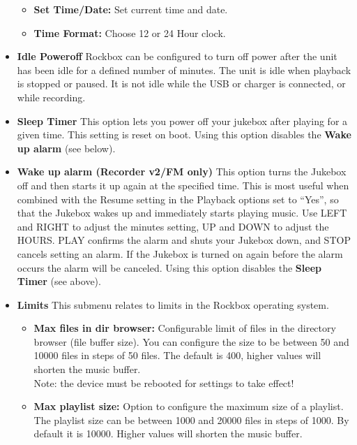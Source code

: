 \begin{itemize}
\begin{itemize}
\item \textbf{Set Time/Date: }
Set current time and date.
\item \textbf{Time Format: }
Choose 12 or 24 Hour clock. 
\end{itemize}

\item \textbf{\label{ref:idlepoweroff}Idle Poweroff}
Rockbox can be configured to turn off power after the unit has been idle
for a defined number of minutes. The unit is idle when playback is
stopped or paused. It is not idle while the USB or charger is
connected, or while recording.

\item \textbf{Sleep Timer}
This option lets you power off your jukebox after playing for a given
time. This setting is reset on boot.  Using this option disables the
\textbf{Wake up alarm} (see below).

\item \textbf{Wake up alarm (Recorder v2/FM only)}
This option turns the Jukebox off and then starts it up again at the
specified time. This is most useful when combined with the Resume
setting in the Playback options set to ``Yes'', so that the Jukebox
wakes up and immediately  starts playing music. Use LEFT and RIGHT to
adjust the minutes setting, UP and DOWN to adjust the HOURS.  PLAY
confirms the alarm and shuts your Jukebox down, and STOP cancels
setting an alarm.  If the Jukebox is turned on again before the alarm
occurs the alarm will be canceled.  Using this option disables the \textbf{Sleep Timer} (see above).

\item \textbf{Limits}
This submenu relates to limits in the Rockbox operating system.

\begin{itemize}
\item \textbf{Max files in dir browser: }Configurable limit of files in
the directory browser (file buffer size). You can configure the size to
be between 50 and 10000 files in steps of 50 files. The default is 400,
higher values will shorten the music buffer.\\

Note: the device must be rebooted for settings to take effect! 
\item \textbf{Max playlist size: }Option to configure the maximum size
of a playlist. The playlist size can be between 1000 and 20000 files in
steps of 1000.  By default it is 10000.  Higher values will shorten the
music buffer.\\


\end{itemize}
\end{itemize}

